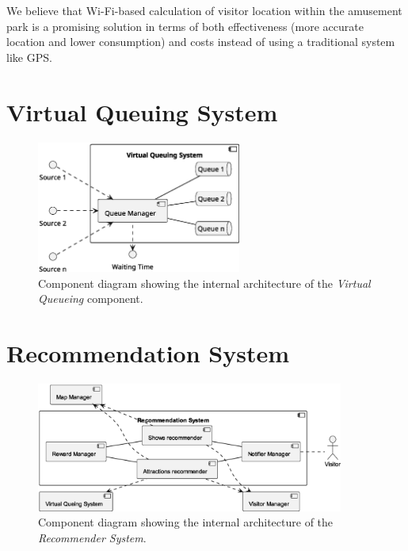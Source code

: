 We believe that Wi-Fi-based calculation of visitor location within the amusement park is a promising solution in terms of both effectiveness
(more accurate location and lower consumption) and costs instead of using a traditional system like GPS.


\section{Virtual Queuing System}
\begin{figure}[H]
	\centering
	\includegraphics[width=0.6\textwidth]{img/virtual-queuing.eps}
	\caption{Component diagram showing the internal architecture of the \textit{Virtual Queueing} component.
	}
	\label{fig:virtual-queueing-arch}
\end{figure}

\section{Recommendation System}

\begin{figure}[H]
	\centering
	\includegraphics[width=0.9\textwidth]{img/recommender.eps}
	\caption{Component diagram showing the internal architecture of the \textit{Recommender System}.
	}
	\label{fig:recommender-arch}
\end{figure}

